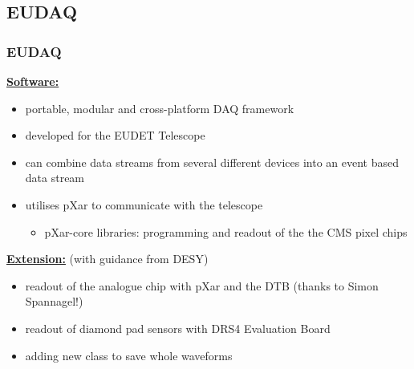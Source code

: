 \documentclass[9pt]{beamer}
\begin{document}
\subsection{EUDAQ}
\begin{frame}
	\frametitle{EUDAQ}
	\underline{\textbf{Software:}}
	\begin{itemize}
		\setlength{\itemsep}{\fill}
		\item portable, modular and cross-platform DAQ framework
		\item developed for the EUDET Telescope
		\item can combine data streams from several different devices into an event based data stream
		\item utilises pXar to communicate with the telescope
		\begin{itemize}
			\item pXar-core libraries: programming and readout of the the CMS pixel chips
		\end{itemize}
	\end{itemize}
	\vspace*{.7cm}
	\underline{\textbf{Extension:}} (with guidance from DESY)
	\begin{itemize}
		\setlength{\itemsep}{\fill}
		\item readout of the analogue chip with pXar and the DTB (thanks to Simon Spannagel!)
		\item readout of diamond pad sensors with DRS4 Evaluation Board
		\item adding new class to save whole waveforms
	\end{itemize}
\end{frame}
\end{document}
